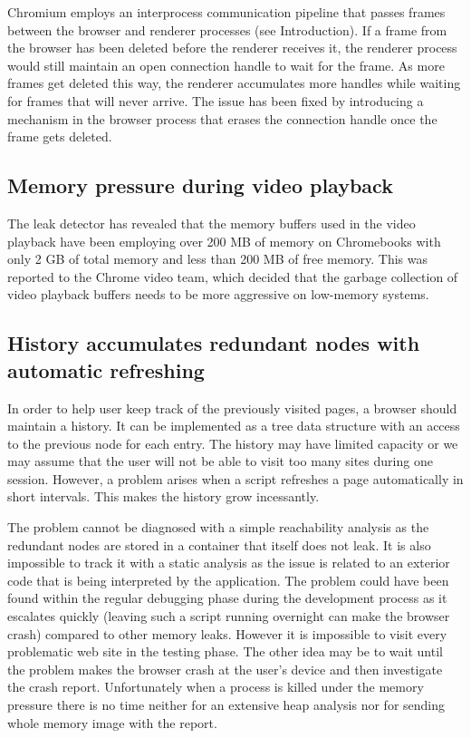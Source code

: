 \documentclass[preprint, numbers]{sigplanconf}
\begin{document}
Chromium employs an interprocess communication pipeline that passes frames between the browser and renderer processes (see Introduction).
If a frame from the browser has been deleted before the renderer receives it,
the renderer process would still maintain an open connection handle to wait for the frame.
As more frames get deleted this way, the renderer accumulates more handles while waiting for frames that will never arrive.
The issue has been fixed by introducing a mechanism in the browser process that erases the connection handle once the frame gets deleted.

\subsection{Memory pressure during video playback \cite{cr-playback}}

The leak detector has revealed that the memory buffers used in the video playback
have been employing over 200 MB of memory on Chromebooks with only 2 GB of total memory and less than 200 MB of free memory.
This was reported to the Chrome video team, which decided that the garbage collection of video playback
buffers needs to be more aggressive on low-memory systems.

\subsection{History accumulates redundant nodes with automatic refreshing \cite{cr-refresh}}

In order to help user keep track of the previously visited pages, a browser should maintain a history.
It can be implemented as a tree data structure with an access to the previous node for each entry.
The history may have limited capacity or
we may assume that the user will not be able
to visit too many sites during one session.
However, a problem arises when a script refreshes a page automatically in short intervals.
This makes the history grow incessantly.

The problem cannot be diagnosed with a simple reachability analysis as the redundant
nodes are stored in a container that itself does not leak.
It is also impossible to track it with a static analysis as the issue is related to an exterior
code that is being interpreted by the application.
The problem could have been found within the regular debugging phase during the development process as
it escalates quickly (leaving such a script running overnight can make the browser crash)
compared to other memory leaks.
However it is impossible to visit every problematic web site in the testing phase.
The other idea may be to wait until the problem makes the browser crash at the user's device
and then investigate the crash report.
Unfortunately when a process is killed under the memory pressure there is no time neither for an extensive
heap analysis nor for sending whole memory image with the report.
\end{document}
